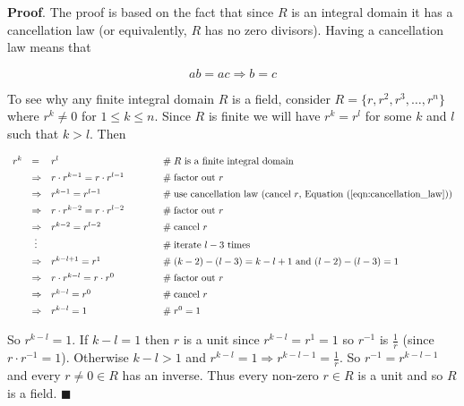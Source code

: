 \documentclass[11pt, oneside]{article}   	%
\theoremstyle{definition}
\begin{document}
\bigskip
\noindent
\textbf{Proof}. The proof is based on the fact that since $R$ is
an integral domain it has a cancellation law (or equivalently,
$R$ has no zero divisors).  Having a cancellation law means that

\begin{equation}
ab = ac \Rightarrow b = c
\label{eqn:cancellation_law}
\end{equation}


\bigskip
\noindent
To see why any finite integral domain $R$ is a field, consider $R
= \{r, r^2, r^3, \hdots, r^n\}$ where $r^k \neq 0$ for $1 \leq k
\leq n$.  Since $R$ is finite we will have $r^k = r^l$ for some
$k$ and $l$ such that $k > l$. Then

\begin{equation*}
\begin{array}{rlll} 
r^k 
&=& r^l                                                 &\quad \qquad \mathrel{\#} \text{$R$ is a finite integral domain} \\
[5pt]
&\Rightarrow& r \cdot r^{k-1} = r \cdot r^{l -1}        &\quad \qquad \mathrel{\#} \text{factor out $r$} \\
[5pt]
&\Rightarrow& r^{k-1} = r^{l -1}                        &\quad \qquad \mathrel{\#} \text{use cancellation law (cancel $r$, Equation (\ref{eqn:cancellation_law})}) \\
[5pt]
&\Rightarrow& r \cdot r^{k-2} = r \cdot r^{l -2}        &\quad \qquad \mathrel{\#} \text{factor out $r$} \\
[5pt]
&\Rightarrow& r^{k-2} = r^{l -2}                        &\quad \qquad \mathrel{\#} \text{cancel $r$} \\
&\;\vdots												&&\quad \qquad \mathrel{\#} \text{iterate $l - 3$ times} \\ 
[5pt]
&\Rightarrow& r^{k - l + 1} = r^1                       &\quad \qquad \mathrel{\#} (k - 2) - (l -3) = k - l + 1 \text{ and } (l - 2) - (l - 3) = 1 \\
[5pt]       
&\Rightarrow& r \cdot r^{k - l} = r \cdot r^0           &\quad \qquad \mathrel{\#} \text{factor out $r$} \\ 
[5pt]
&\Rightarrow& r^{k-l} = r^{0}                           &\quad \qquad \mathrel{\#} \text{cancel $r$} \\ 
[5pt]
&\Rightarrow& r^{k-l} = 1                               &\quad \qquad\mathrel{\#} r^0 = 1
\end{array}
\end{equation*}

\bigskip
{}
\noindent
So $ r^{k-l} = 1 $. If $k-l = 1$ then $r$ is a unit since
$r^{k-l} = r^{1} = 1$ so $r^{-1}$ is $\frac{1}{r}$ (since $r
\cdot r^{-1} = 1$). Otherwise $k-l > 1$ and $r^{k-l} = 1
\Rightarrow r^{k-l-1} = \frac{1}{r}$.  So $r^{-1} = r^{k-l -1}$
and every $r \neq 0 \in R$ has an inverse. Thus every non-zero $r
\in R$ is a unit and so $R$ is a field. $\blacksquare$
\end{document}
